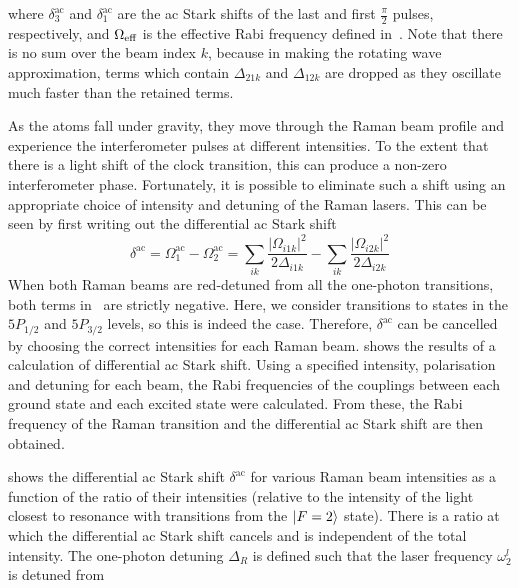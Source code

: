 where \(\delta_3^\text{ac}\) and \(\delta_1^\text{ac}\) are the ac
Stark shifts of the last and first \(\frac{\pi}{2}\) pulses,
respectively, and $\Omega_\textnormal{eff}$ is the effective Rabi
frequency defined in~. Note that there
is no sum over the beam index $k$, because in making the rotating wave
approximation, terms which contain $\Delta_{21k}$ and $\Delta_{12k}$
are dropped as they oscillate much faster than the retained terms. 
\par\noindent
As the atoms fall
under gravity, they move through the Raman beam profile and experience
the interferometer pulses at different intensities. To the extent that
there is a light shift of the clock transition, this can produce a
non-zero interferometer phase. Fortunately, it is possible
to eliminate such a shift using an appropriate choice
of intensity and detuning of the Raman lasers. This can be seen by
first writing out the differential ac Stark shift
\begin{equation}
  \delta^\text{ac} = \Omega_1^\text{ac} - \Omega_2^\text{ac} = \sum_{ik}
  \frac{\lvert\Omega_{i1k}\rvert^2}{2\Delta_{i1k}} - \sum_{ik}
  \frac{\lvert\Omega_{i2k}\rvert^2}{2\Delta_{i2k}} 
  \label{eq:diff_shift}
\end{equation}
When both Raman beams are red-detuned from
all the one-photon transitions, both terms
in~ are strictly negative. Here, we
consider transitions to states in the $5P_{1/2}$ and $5P_{3/2}$
levels, so this is indeed the case. Therefore,
\(\delta^\text{ac}\) can be cancelled by choosing the correct
intensities for each Raman beam. 
shows the results of a calculation of differential ac Stark shift.
Using a
specified intensity, polarisation and detuning for each beam, the Rabi
frequencies of the couplings between each ground state and each
excited state were calculated. From these, the Rabi frequency of the
Raman transition and the differential ac Stark shift are then
obtained. \par\noindent
{} shows the differential ac
Stark shift \(\delta^{\text{ac}}\)
for various Raman beam intensities as a function of the ratio of their
intensities (relative to the intensity of the light closest to
resonance with transitions from the $\ket{F=2}$ state). There
is a ratio at which the differential ac Stark shift cancels and is
independent of the total intensity. The one-photon detuning $\Delta_R$
is defined such that the laser frequency $\omega_2^l$ is detuned from
